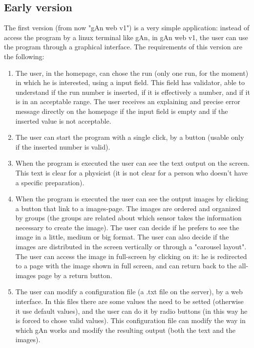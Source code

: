 \subsection{Early version}
The first version (from now "gAn web v1") is a very simple application: instead of access the program by a linux terminal like gAn, in gAn web v1, the user can 
use the program through a graphical interface. 
The requirements of this version are the following:
\begin{enumerate}

\item The user, in the homepage, can chose the run (only one run, for the moment) in which he is interested, using a input field. This field has validator, able to understand if the run number is inserted, if it is effectively a number, and if it is in an acceptable range. The user receives an explaining and precise error message directly on the homepage if the input field is empty and if the inserted value is not acceptable.

\item The user can start the program with a single click, by a button (usable only if the inserted number is valid).

\item When the program is executed the user can see the text output on the screen. This text is clear for a physicist (it is not clear for a person who doesn't have a specific preparation). 

\item When the program is executed the user can see the output images by clicking a button that link to a images-page. The images are ordered and organized by groups (the groups are related about which sensor takes the information necessary to create the image). The user can decide if he prefers to see the image in a little, medium or big format. The user can also decide if the images are distributed in the screen vertically or through a "carousel layout". The user can access the image in full-screen by clicking on it: he is redirected to a page with the image shown in full screen, and can return back to the all-images page by a return button. 

\item The user can modify a configuration file (a .txt file on the server), by a web interface. In this files there are some values the need to be setted (otherwise it use default values), and the user can do it by radio buttons (in this way he is forced to chose valid values). This configuration file can modify the way in which gAn works and modify the resulting output (both the text and the images).   

\end{enumerate}

